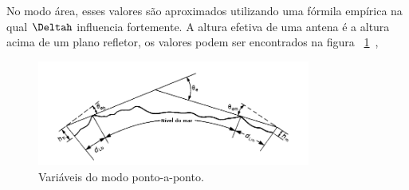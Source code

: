 No modo área, esses valores são aproximados utilizando uma fórmila empírica na qual $\Deltah$ influencia fortemente.
A altura efetiva de uma antena é a altura acima de um plano refletor, os valores podem ser encontrados na figura ~\ref{fig:radiohorizon}~\cite{irregularterrain}, 

\begin{figure}[radiohorizon]
\centering
\includegraphics[width=0.8\textwidth]{figs/radiohorizon}
\caption[Variáveis do modo ponto-a-ponto.]
{Variáveis do modo ponto-a-ponto.}
\label{fig:radiohorizon}
\end{figure}

